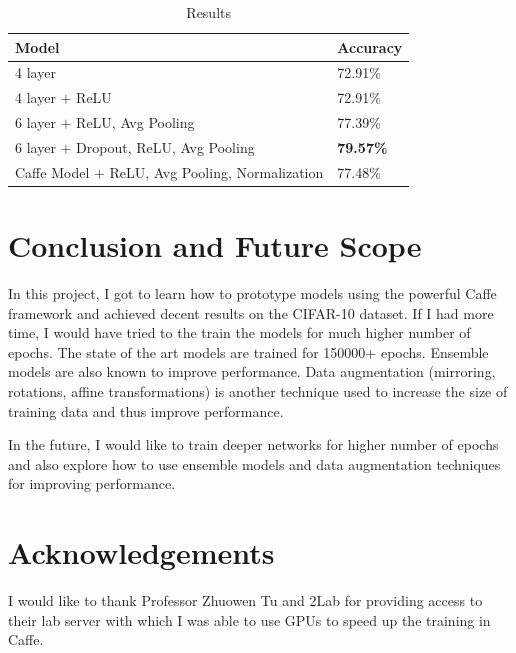 \documentclass[10pt,twocolumn,letterpaper]{article}
\begin{document}
\begin{table}[h]
\begin{tabular}{|l|l|}
\hline
Model & Accuracy \\ \hline
4 layer & 72.91\%    \\ \hline
4 layer $+$ ReLU & 72.91\%    \\ \hline
6 layer $+$ ReLU, Avg Pooling & 77.39\%    \\ \hline
6 layer $+$ Dropout, ReLU, Avg Pooling & \textbf{79.57\%}    \\ \hline
Caffe Model $+$ ReLU, Avg Pooling, Normalization & 77.48\%    \\ \hline
\end{tabular}
\label{result}
\caption{Results}
\end{table}

\section{Conclusion and Future Scope}

In this project, I got to learn how to prototype models using the powerful Caffe framework and achieved decent results on the CIFAR-10 dataset. If I had more time, I would have tried to the train the models for much higher number of epochs. The state of the art models are trained for 150000+ epochs. Ensemble models are also known to improve performance. Data augmentation (mirroring, rotations, affine transformations) is another technique used to increase the size of training data and thus improve performance.

In the future, I would like to train deeper networks for higher number of epochs and also explore how to use ensemble models and data augmentation techniques for improving performance.

\section{Acknowledgements}

I would like to thank Professor Zhuowen Tu and 2Lab for providing access to their lab server with which I was able to use GPUs to speed up the training in Caffe.
 

{\small


}
\end{document}
